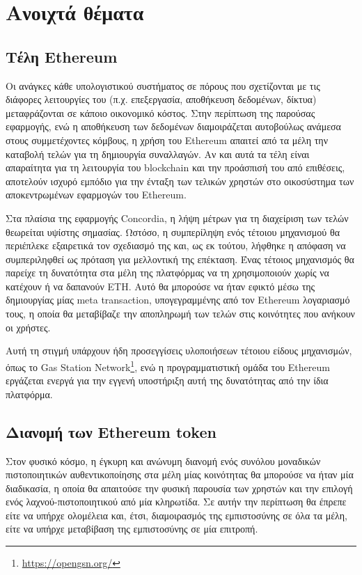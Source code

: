 \section{Ανοιχτά θέματα}\label{section:5-4-open-areas}

\subsection{Τέλη Ethereum}\label{subsection:5-4-1-ethereum-fees}

Οι ανάγκες κάθε υπολογιστικού συστήματος σε πόρους που σχετίζονται με τις διάφορες λειτουργίες του (π.χ. επεξεργασία, αποθήκευση δεδομένων, δίκτυα) μεταφράζονται σε κάποιο οικονομικό κόστος. Στην περίπτωση της παρούσας εφαρμογής, ενώ η αποθήκευση των δεδομένων διαμοιράζεται αυτοβούλως ανάμεσα στους συμμετέχοντες κόμβους, η χρήση του Ethereum απαιτεί από τα μέλη την καταβολή τελών για τη δημιουργία συναλλαγών. Αν και αυτά τα τέλη είναι απαραίτητα για τη λειτουργία του blockchain και την προάσπισή του από επιθέσεις, αποτελούν ισχυρό εμπόδιο για την ένταξη των τελικών χρηστών στο οικοσύστημα των αποκεντρωμένων εφαρμογών του Ethereum.

Στα πλαίσια της εφαρμογής Concordia, η λήψη μέτρων για τη διαχείριση των τελών θεωρείται υψίστης σημασίας. Ωστόσο, η συμπερίληψη ενός τέτοιου μηχανισμού θα περιέπλεκε εξαιρετικά τον σχεδιασμό της και, ως εκ τούτου, λήφθηκε η απόφαση να συμπεριληφθεί ως πρόταση για μελλοντική της επέκταση. Ένας τέτοιος μηχανισμός θα παρείχε τη δυνατότητα στα μέλη της πλατφόρμας να τη χρησιμοποιούν χωρίς να κατέχουν ή να δαπανούν ETH. Αυτό θα μπορούσε να ήταν εφικτό μέσω της δημιουργίας μίας meta transaction, υπογεγραμμένης από τον Ethereum λογαριασμό τους, η οποία θα μεταβίβαζε την αποπληρωμή των τελών στις κοινότητες που ανήκουν οι χρήστες.

Αυτή τη στιγμή υπάρχουν ήδη προσεγγίσεις υλοποιήσεων τέτοιου είδους μηχανισμών, όπως το Gas Station Network\footnote{\url{https://opengsn.org/}}, ενώ η προγραμματιστική ομάδα του Ethereum εργάζεται ενεργά για την εγγενή υποστήριξη αυτή της δυνατότητας από την ίδια πλατφόρμα.

\subsection{Διανομή των Ethereum token}\label{subsection:5-4-1-ethereum-fees}

Στον φυσικό κόσμο, η έγκυρη και ανώνυμη διανομή ενός συνόλου μοναδικών πιστοποιητικών αυθεντικοποίησης στα μέλη μίας κοινότητας θα μπορούσε να ήταν μία διαδικασία, η οποία θα απαιτούσε την φυσική παρουσία των χρηστών και την επιλογή ενός λαχνού-πιστοποιητικού από μία κληρωτίδα. Σε αυτήν την περίπτωση θα έπρεπε είτε να υπήρχε ολομέλεια και, έτσι, διαμοιρασμός της εμπιστοσύνης σε όλα τα μέλη, είτε να υπήρχε μεταβίβαση της εμπιστοσύνης σε μία επιτροπή.

